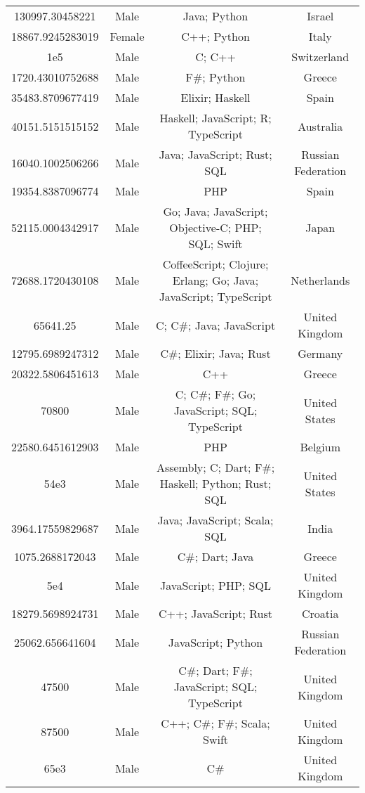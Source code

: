 \begin{center}
\begin{tabular}{ |c|c|c|c| }
130997.30458221  &  Male  &  Java; Python  &  Israel  \\ 
18867.9245283019  &  Female  &  C++; Python  &  Italy  \\ 
1e5  &  Male  &  C; C++  &  Switzerland  \\ 
1720.43010752688  &  Male  &  F\#; Python  &  Greece  \\ 
35483.8709677419  &  Male  &  Elixir; Haskell  &  Spain  \\ 
40151.5151515152  &  Male  &  Haskell; JavaScript; R; TypeScript  &  Australia  \\ 
16040.1002506266  &  Male  &  Java; JavaScript; Rust; SQL  &  Russian Federation  \\ 
19354.8387096774  &  Male  &  PHP  &  Spain  \\ 
52115.0004342917  &  Male  &  Go; Java; JavaScript; Objective-C; PHP; SQL; Swift  &  Japan  \\ 
72688.1720430108  &  Male  &  CoffeeScript; Clojure; Erlang; Go; Java; JavaScript; TypeScript  &  Netherlands  \\ 
65641.25  &  Male  &  C; C\#; Java; JavaScript  &  United Kingdom  \\ 
12795.6989247312  &  Male  &  C\#; Elixir; Java; Rust  &  Germany  \\ 
20322.5806451613  &  Male  &  C++  &  Greece  \\ 
70800  &  Male  &  C; C\#; F\#; Go; JavaScript; SQL; TypeScript  &  United States  \\ 
22580.6451612903  &  Male  &  PHP  &  Belgium  \\ 
54e3  &  Male  &  Assembly; C; Dart; F\#; Haskell; Python; Rust; SQL  &  United States  \\ 
3964.17559829687  &  Male  &  Java; JavaScript; Scala; SQL  &  India  \\ 
1075.2688172043  &  Male  &  C\#; Dart; Java  &  Greece  \\ 
5e4  &  Male  &  JavaScript; PHP; SQL  &  United Kingdom  \\ 
18279.5698924731  &  Male  &  C++; JavaScript; Rust  &  Croatia  \\ 
25062.656641604  &  Male  &  JavaScript; Python  &  Russian Federation  \\ 
47500  &  Male  &  C\#; Dart; F\#; JavaScript; SQL; TypeScript  &  United Kingdom  \\ 
87500  &  Male  &  C++; C\#; F\#; Scala; Swift  &  United Kingdom  \\ 
65e3  &  Male  &  C\#  &  United Kingdom  \\ 

\end{tabular}
\end{center}
